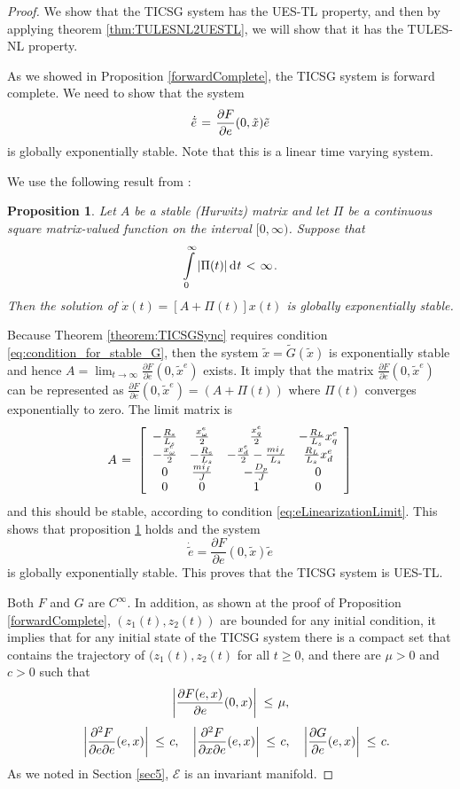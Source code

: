 \documentclass[letterpaper,10pt,conference]{ieeeconf}
\newtheorem{proposition}[theorem]{Proposition}
\renewcommand{\o}    {{\omega}}
\newcommand{\m}      {{\hbox{\hskip 1pt}}}
\newcommand{\dd}     {{\rm d\hbox{\hskip 0.5pt}}}
\newcommand{\Emscr}  {{\mathcal{E}}}
\begin{document}
\begin{proof}
We show that the TICSG system has the UES-TL property, and then by
applying theorem \ref{thm:TULESNL2UESTL}, we will show that it has
the TULES-NL property.

As we showed in Proposition \ref{forwardComplete}, the TICSG 
system is forward complete. We need to show that the system
$$ \dot{\tilde{e}} \m=\m \frac{\partial F}{\partial e}(0,\tilde{x})
   \tilde{e}$$
is globally exponentially stable. Note that this is a linear time
varying system.

We use the following result from \cite[Theorem 4.2.7]
{SchovanecGilliam1999}:

\begin{proposition}\label{proposition:LTVStability}
Let $A$ be a stable (Hurwitz) matrix and let $\Pi$ be a
continuous square matrix-valued function on the interval
$[0,\infty)$. Suppose that
$$\intop_0^\infty \left|\Pi(t)\right| \dd t \m<\m \infty \m.$$
Then the solution of $\dot{x}(t)=[A+\Pi(t)]x(t)$ is globally 
exponentially stable.
\end{proposition}
 
Because Theorem \ref{theorem:TICSGSync} requires condition
\eqref{eq:condition_for_stable_G}, then the system $\tilde{x}=
\tilde{G}(\tilde{x})$ is exponentially stable and hence $A =
\lim_{t \to \infty}\frac{\partial F}{\partial e}(0,\tilde{x}^e)$
exists.  It imply that the matrix $\frac{\partial F}{\partial
e}(0,\tilde{x}^e)$ can be represented as $\frac{\partial F}{\partial
e}(0,\tilde{x}^e)=\left(A+\Pi(t)\right)$ where $\Pi(t)$ converges
exponentially to zero. The limit matrix is
$$ A \m=\m \left[\begin{array}{cccc} -\frac{R_{s}}{L_s} & 
   \frac{x^e_\o}{2} & \frac{x^e_q}{2} & -\frac{R_L}{L_s} x^e_q\\
   -\frac{x^e_\o}{2} & -\frac{R_s}{L_s} & -\frac{x^e_d}{2}-\frac
   {mi_f}{L_s} & \frac{R_L}{L_s} x^e_d\\ 0 & \frac{mi_f}{J} & 
   -\frac{D_p}{J} & 0\\ 0 & 0 & 1 & 0 \end{array}\right]$$
and this should be stable, according to condition
\eqref{eq:eLinearizationLimit}. This shows that proposition
\ref{proposition:LTVStability} holds and the system
$$ \dot{\tilde{e}}=\frac{\partial F}{\partial e}(0,\tilde{x})
   \tilde{e}$$
is globally exponentially stable. This proves that the TICSG system
is UES-TL. 

Both $F$ and $G$ are $C^\infty$. In addition, as shown at the proof of
Proposition \ref{forwardComplete}, $\left(z_1(t),z_2(t)\right)$ are
bounded for any initial condition, it implies that for any initial
state of the TICSG system there is a compact set that contains the
trajectory of $(z_1(t),z_2(t)$ for all $t\geq 0$, and there are
$\mu>0$ and $c>0$ such that
$$\left|\frac{\partial F(e,x)}{\partial e}(0,x)\right| \m\leq\m \mu,$$
$$ \quad \left| \frac{\partial^2 F}{\partial e \partial e}(e,x)\right|
   \m\leq\m c, \quad \left| \frac{\partial^2 F}{\partial x \partial e}
   (e,x)\right| \m\leq\m c,\quad\left| \frac{\partial G}{\partial e}
   (e,x) \right| \m\leq\m c.$$
As we noted in Section \ref{sec5}, $\Emscr$ is an invariant manifold.


\end{proof}
\end{document}
